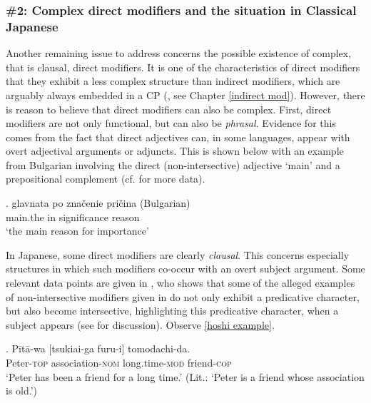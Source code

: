 \documentclass [output=book,colorlinks,citecolor=brown]{langscibook}
\begin{document}
\subsubsection{\#2: Complex direct modifiers and the situation in Classical Japanese} \label{complexdirect}

Another remaining issue to address concerns the possible existence of complex, that is clausal, direct modifiers. It is one of the characteristics of direct modifiers that they exhibit a less complex structure than indirect modifiers, which are arguably always embedded in a CP (\citealt{cinque:2010:adj, cinque:2020:relcl}, see Chapter \ref{indirect mod}). However, there is reason to believe that direct modifiers can also be complex. First, direct modifiers are not only functional, but can also be \textit{phrasal}. Evidence for this comes from the fact that direct adjectives can, in some languages, appear with overt adjectival arguments or adjuncts. This is shown below with an example from Bulgarian involving the direct (non-intersective) adjective `main’ and a prepositional complement (cf. \citealt[ch. 4.1.2]{cinque:2010:adj} for more data). %

\exg. glavnata po zna\v{c}enie pri\v{c}ina (Bulgarian)\\
main.the in significance reason\\
`the main reason for importance’ \null \hfill \citep[47]{cinque:2010:adj}

In Japanese, some direct modifiers are clearly \textit{clausal}. This concerns especially structures in which such modifiers co-occur with an overt subject argument. Some relevant data points are given in \citet{hoshi:2002:kaynean}, who shows that some of the alleged examples of non-intersective modifiers given in \citet{yamakido:2000:japanese} do not only exhibit a predicative character, but also become intersective, highlighting this predicative character, when a subject appears (see \citealt{yamakido:2005:nature} for discussion). Observe \ref{hoshi example}. %

\exg. Pītā-wa [tsukiai-ga furu-i] tomodachi-da.\\
Peter-\textsc{top} association-\textsc{nom} long.time-\textsc{mod} friend-\textsc{cop}\\
`Peter has been a friend for a long time.’ (Lit.: `Peter is a friend whose association is old.’) \\ \null \hfill \citep[11]{hoshi:2002:kaynean} \label{hoshi example}
\end{document}
